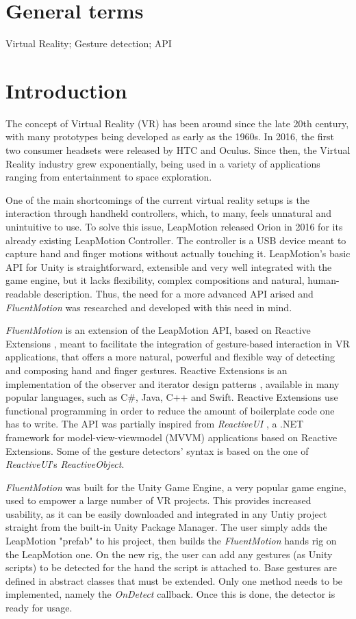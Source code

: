 \documentclass{sigchi}
\def\fluentmotion{\textit{FluentMotion}}
\def\rx{Reactive Extensions}
\def\unity{Unity Game Engine}
\def\leap{LeapMotion}
\def\vr{Virtual Reality}
\def\reactiveui{\textit{ReactiveUI}}
\begin{document}
\section{General terms}
Virtual Reality; Gesture detection; API

\section{Introduction}
The concept of \vr{} (VR) has been around since the late 20th century, with many prototypes being developed as early as the 1960s. In 2016, the first two consumer headsets were released by HTC and Oculus. Since then, the \vr{} industry grew exponentially, being used in a variety of applications ranging from entertainment to space exploration.

One of the main shortcomings of the current virtual reality setups is the interaction through handheld controllers, which, to many, feels unnatural and unintuitive to use. To solve this issue, LeapMotion released Orion \cite{Orion} in 2016 for its already existing LeapMotion Controller. The controller is a USB device meant to capture hand and finger motions without actually touching it. \leap{}'s basic API for Unity is straightforward, extensible and very well integrated with the game engine, but it lacks flexibility, complex compositions and natural, human-readable description. Thus, the need for a more advanced API arised and \fluentmotion{} was researched and developed with this need in mind.

\fluentmotion{} is an extension of the \leap{} API, based on \rx{} \cite{rx}, meant to facilitate the integration of gesture-based interaction in VR applications, that offers a more natural, powerful and flexible way of detecting and composing hand and finger gestures. \rx{} is an implementation of the observer and iterator design patterns \cite{DPEROOS}, available in many popular languages, such as C\#, Java, C++ and Swift. \rx{} use functional programming in order to reduce the amount of boilerplate code one has to write. The API was partially inspired from \reactiveui{} \cite{ReactiveUI}, a .NET framework for model-view-viewmodel (MVVM) applications based on \rx{}. Some of the gesture detectors' syntax is based on the one of \reactiveui{}'s \textit{ReactiveObject}.

\fluentmotion{} was built for the \unity{}, a very popular game engine, used to empower a large number of VR projects. This provides increased usability, as it can be easily downloaded and integrated in any Untiy project straight from the built-in Unity Package Manager. The user simply adds the \leap{} "prefab" to his project, then builds the \fluentmotion{} hands rig on the \leap{} one. On the new rig, the user can add any gestures (as Unity scripts) to be detected for the hand the script is attached to. Base gestures are defined in abstract classes that must be extended. Only one method needs to be implemented, namely the \textit{OnDetect} callback. Once this is done, the detector is ready for usage.
\end{document}
